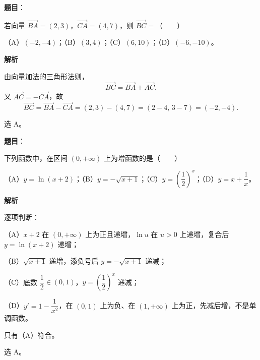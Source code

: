 \begin{answer}

\textbf{题目}：

若向量 $\overrightarrow{BA}=(2,3)$，$\overrightarrow{CA}=(4,7)$，则 $\overrightarrow{BC}=$\mbox{（　　）}

（A）$(-2,-4)$；（B）$(3,4)$；（C）$(6,10)$；（D）$(-6,-10)$。

\textbf{解析}

由向量加法的三角形法则，
\nopagebreak[4]
\[\overrightarrow{BC}=\overrightarrow{BA}+\overrightarrow{AC}.\]
又 $\overrightarrow{AC}=-\overrightarrow{CA}$，故
\nopagebreak[4]
\[\overrightarrow{BC}=\overrightarrow{BA}-\overrightarrow{CA}=(2,3)-(4,7)=(2-4,\,3-7)=(-2,-4).\]

选 A。


\end{answer}
\begin{answer}

\textbf{题目}：

下列函数中，在区间 $(0,+\infty)$ 上为增函数的是\mbox{（　　）}

（A）$y=\ln(x+2)$；（B）$y=-\sqrt{x+1}$；（C）$y=\left(\dfrac12\right)^x$；（D）$y=x+\dfrac1x$。

\textbf{解析}

逐项判断：

（A）$x+2$ 在 $(0,+\infty)$ 上为正且递增，$\ln u$ 在 $u>0$ 上递增，复合后 $y=\ln(x+2)$ 递增；

（B）$\sqrt{x+1}$ 递增，添负号后 $y=-\sqrt{x+1}$ 递减；

（C）底数 $\dfrac12\in(0,1)$，$y=\left(\dfrac12\right)^x$ 递减；

（D）$y'=1-\dfrac1{x^2}$，在 $(0,1)$ 上为负、在 $(1,+\infty)$ 上为正，先减后增，不是单调函数。

只有（A）符合。

选 A。


\end{answer}
